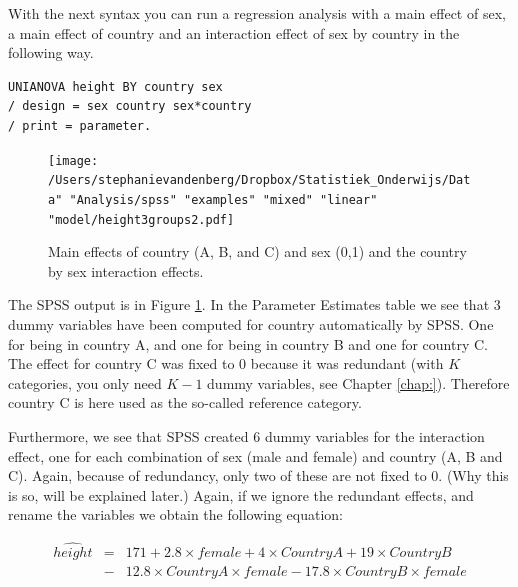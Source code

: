 \documentclass[]{book}\usepackage[]{graphicx}\usepackage[]{color}
\begin{document}
With the next syntax you can run a regression analysis with a main effect of sex, a main effect of country and an interaction effect of sex by country in the following way.

\begin{verbatim}
UNIANOVA height BY country sex 
/ design = sex country sex*country
/ print = parameter.
\end{verbatim}


\begin{figure}[h]
    \begin{center}
       \texttt{[image: /Users/stephanievandenberg/Dropbox/Statistiek\_Onderwijs/Data" "Analysis/spss" "examples" "mixed" "linear" "model/height3groups2.pdf]}
    \end{center}
    \label{fig:interactionheight3group}
    \caption{Main effects of country (A, B, and C) and sex (0,1) and the country by sex interaction effects.}
\end{figure}

The SPSS output is in Figure \ref{fig:interactionheight3group}. In the Parameter Estimates table we see that 3 dummy variables have been computed for country automatically by SPSS. One for being in country A, and one for being in country B and one for country C. The effect for country C was fixed to 0 because it was redundant (with $K$ categories, you only need $K-1$ dummy variables, see Chapter \ref{chap:}). Therefore country C is here used as the so-called reference category. 

Furthermore, we see that SPSS created 6 dummy variables for the interaction effect, one for each combination of sex (male and female) and country (A, B and C). Again, because of redundancy, only two of these are not fixed to 0. (Why this is so, will be explained later.) Again, if we ignore the redundant effects, and rename the variables we obtain the following equation:


\begin{eqnarray} 
\widehat{height} &=& 171 + 2.8  \times female + 4 \times CountryA +  19 \times CountryB \nonumber\\ 
&-& 12.8 \times CountryA \times female - 17.8 \times CountryB \times female  \nonumber
\end{eqnarray}
\end{document}
